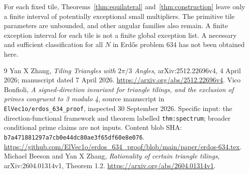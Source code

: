 \documentclass[11pt]{article}
\begin{document}
For each fixed tile, Theorems~\ref{thm:equilateral} and~\ref{thm:construction} leave only a finite interval of potentially exceptional small multipliers. The primitive tile parameters are unbounded, and other angular families also remain. A finite exception interval for each tile is not a finite global exception list. A necessary and sufficient classification for all $N$ in Erd\H{o}s problem 634 has not been obtained here.

\begin{thebibliography}{9}
 Yan X Zhang, \emph{Tiling Triangles with $2\pi/3$ Angles}, arXiv:2512.22696v4, 4 April 2026; manuscript dated 7 April 2026. \url{https://arxiv.org/abs/2512.22696v4}.
 Vico Bonfioli, \emph{A signed-direction invariant for triangle tilings, and the exclusion of primes congruent to 3 modulo 4}, source manuscript in \texttt{ElVec1o/erdos\_634\_proof}, inspected 30 September 2026. Specific input: the direction-functional framework and theorem labelled \texttt{thm:spectrum}; broader conditional prime claims are not inputs. Content blob SHA: \texttt{b7a471881297a7cb0e44dc80ae3f65df60e8e076}. \url{https://github.com/ElVec1o/erdos_634_proof/blob/main/paper/erdos-634.tex}.
 Michael Beeson and Yan X Zhang, \emph{Rationality of certain triangle tilings}, arXiv:2604.01314v1, Theorem 1.2. \url{https://arxiv.org/abs/2604.01314v1}.
\end{thebibliography}
\end{document}
